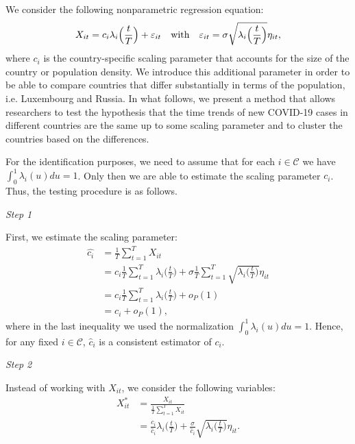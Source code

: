 \documentclass[a4paper,11pt]{article}
\numberwithin{equation}{section}
\begin{document}
We consider the following nonparametric regression equation:
\begin{equation*}
X_{it} = c_i \lambda_i\Big(\frac{t}{T}\Big) + \varepsilon_{it} \quad \text{with} \quad \varepsilon_{it} = \sigma \sqrt{\lambda_i\Big(\frac{t}{T}\Big)} \eta_{it}, 
\end{equation*}
where $c_i$ is the country-specific scaling parameter that accounts for the size of the country or population density. We introduce this additional parameter in order to be able to compare countries that differ substantially in terms of the population, i.e. Luxembourg and Russia.  In what follows, we present a method that allows researchers to test the hypothesis that the time trends of new COVID-19 cases in different countries are the same up to some scaling parameter and to cluster the countries based on the differences.

For the identification purposes, we need to assume that for each $i \in \mathcal{C}$ we have $\int_0^1 \lambda_i(u)du = 1$. Only then we are able to estimate the scaling parameter $c_i$. Thus, the testing procedure is as follows.

\textit{Step 1}

First, we estimate the scaling parameter:
\begin{align*}
\widehat{c_i} &= \frac{1}{T}\sum_{t = 1}^T X_{it} \\
&= c_i \frac{1}{T}\sum_{t = 1}^T \lambda_i\Big(\frac{t}{T}\Big) + \sigma\frac{1}{T}\sum_{t = 1}^T \sqrt{\lambda_i\Big(\frac{t}{T}\Big)} \eta_{it}\\
& = c_i \frac{1}{T}\sum_{t = 1}^T \lambda_i\Big(\frac{t}{T}\Big) + o_P(1)\\
& = c_i + o_P(1),
\end{align*}
where in the last inequality we used the normalization $\int_0^1 \lambda_i(u)du = 1$. Hence, for any fixed $i \in \mathcal{C}$, $\widehat{c}_i$ is a consistent estimator of $c_i$.

\textit{Step 2}

Instead of working with $X_{it}$, we consider the following variables:
\begin{align*}
X^*_{it} &= \frac{X_{it}}{\frac{1}{T}\sum_{t = 1}^T X_{it}} \\
&= \frac{c_i}{\widehat{c}_i} \lambda_i \Big(\frac{t}{T}\Big) + \frac{\sigma}{\widehat{c}_i} \sqrt{\lambda_i\Big(\frac{t}{T}\Big)} \eta_{it}.
\end{align*}
\end{document}
